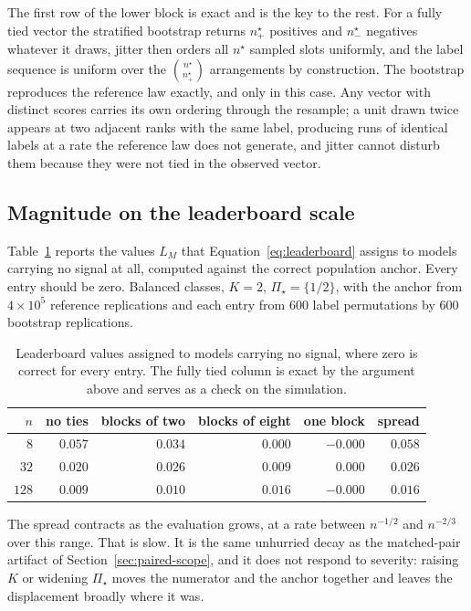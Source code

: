 \documentclass[11pt]{article}
\newcommand{\PSet}{\Pi_\star}
\theoremstyle{remark}
\begin{document}
The first row of the lower block is exact and is the key to the rest. For a fully tied vector the stratified bootstrap returns $n^\star_+$ positives and $n^\star_-$ negatives whatever it draws, jitter then orders all $n^\star$ sampled slots uniformly, and the label sequence is uniform over the $\binom{n^\star}{n^\star_+}$ arrangements by construction. The bootstrap reproduces the reference law exactly, and only in this case. Any vector with distinct scores carries its own ordering through the resample; a unit drawn twice appears at two adjacent ranks with the same label, producing runs of identical labels at a rate the reference law does not generate, and jitter cannot disturb them because they were not tied in the observed vector.

\subsection{Magnitude on the leaderboard scale}

Table~\ref{tab:anchor-decay} reports the values $L_M$ that Equation~\eqref{eq:leaderboard} assigns to models carrying no signal at all, computed against the correct population anchor. Every entry should be zero. Balanced classes, $K=2$, $\PSet=\{1/2\}$, with the anchor from $4\times10^{5}$ reference replications and each entry from $600$ label permutations by $600$ bootstrap replications.

\begin{table}[ht]
\centering
\caption{Leaderboard values assigned to models carrying no signal, where zero is correct for every entry. The fully tied column is exact by the argument above and serves as a check on the simulation.}
\label{tab:anchor-decay}
\begin{tabular}{@{}rrrrrr@{}}
\toprule
$n$ & no ties & blocks of two & blocks of eight & one block & spread \\
\midrule
$8$ & $0.057$ & $0.034$ & $0.000$ & $-0.000$ & $0.058$ \\
$32$ & $0.020$ & $0.026$ & $0.009$ & $0.000$ & $0.026$ \\
$128$ & $0.009$ & $0.010$ & $0.016$ & $-0.000$ & $0.016$ \\
\bottomrule
\end{tabular}
\end{table}

The spread contracts as the evaluation grows, at a rate between $n^{-1/2}$ and $n^{-2/3}$ over this range. That is slow. It is the same unhurried decay as the matched-pair artifact of Section~\ref{sec:paired-scope}, and it does not respond to severity: raising $K$ or widening $\PSet$ moves the numerator and the anchor together and leaves the displacement broadly where it was.
\end{document}
